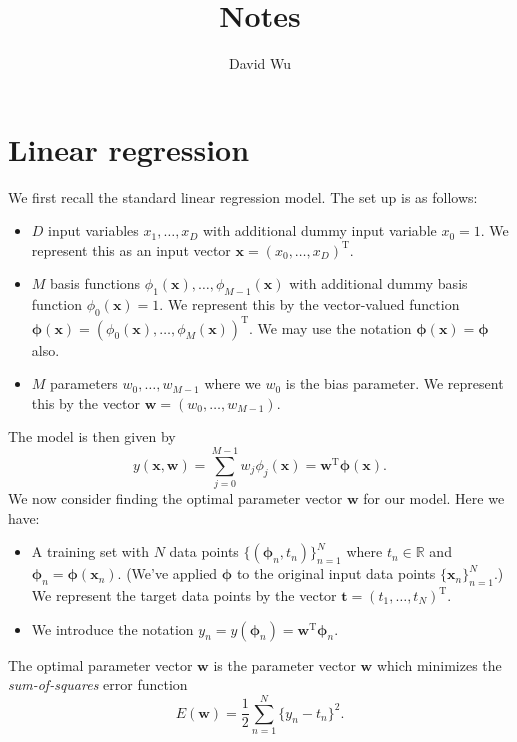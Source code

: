 \documentclass[11pt]{amsart}
\theoremstyle{definition}
\theoremstyle{remark}
\newcommand{\vect}[1]{\mathbf{#1}}
\newcommand{\transpose}{\text{T}}
\begin{document}
\lstset{language=}
\pagestyle{plain}

\title{Notes}
\author{David Wu}

\maketitle

\tableofcontents

\section{Linear regression}\label{s:linear_regression}
    We first recall the standard linear regression model. The set up is as follows:
    \begin{itemize}
        \item $D$ input variables $x_1, \dots, x_D$ with additional dummy input variable $x_0 = 1$. We represent this as an input vector $\vect{x} = (x_0, \dots, x_D)^\transpose$.
        \item $M$ basis functions $\phi_1(\vect{x}), \dots, \phi_{M-1}(\vect{x})$ with additional dummy basis function $\phi_0(\vect{x}) = 1$. We represent this by the vector-valued function $\bm{\phi}(\vect{x}) = (\phi_0(\vect{x}), \dots, \phi_M(\vect{x}))^\transpose$. We may use the notation $\bm{\phi}(\vect{x}) = \bm{\phi}$ also.
        \item $M$ parameters $w_0, \dots, w_{M-1}$ where we $w_0$ is the bias parameter. We represent this by the vector $\vect{w} = (w_0, \dots, w_{M-1})$.
    \end{itemize}
    The model is then given by
    \begin{equation*}
        y(\vect{x}, \vect{w}) = \sum_{j=0}^{M-1} w_j \phi_j(\vect{x}) = \vect{w}^\transpose \bm{\phi}(\vect{x}).
    \end{equation*}
    We now consider finding the optimal parameter vector $\vect{w}$ for our model. Here we have:
    \begin{itemize}
        \item A training set with $N$ data points $\{(\bm{\phi}_n, t_n)\}_{n=1}^{N}$ where $t_n \in \mathbb{R}$ and $\bm{\phi}_n = \bm{\phi}(\vect{x}_n)$. (We've applied $\bm{\phi}$ to the original input data points $\{\vect{x}_n\}_{n=1}^{N}$.) We represent the target data points by the vector $\vect{t} = (t_1, \dots, t_N)^\transpose$.
        \item We introduce the notation $y_n = y(\bm{\phi}_n) = \vect{w}^\transpose \bm{\phi}_n$.
    \end{itemize}
    The optimal parameter vector $\vect{w}$ is the parameter vector $\vect{w}$ which minimizes the \emph{sum-of-squares} error function
    \begin{equation}\label{e:sum_of_squares}
        E(\vect{w}) = \frac{1}{2} \sum_{n=1}^{N} 
                       \{y_n - t_n\}^2.
    \end{equation}
\end{document}
